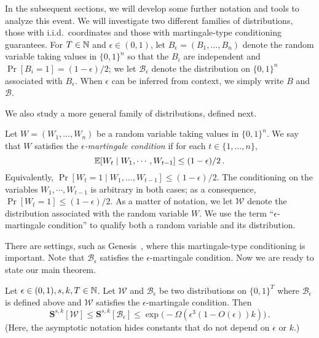 In the subsequent sections, we will develop some further notation and
tools to analyze this event.  We will investigate two different
families of distributions, those with i.i.d.\ coordinates and those
with martingale-type conditioning guarantees. For $T \in \mathbb{N}$ and
$\epsilon \in (0, 1)$, let $B_\epsilon = (B_1, \ldots, B_n)$ denote
the random variable taking values in $\{0,1\}^n$ so that the $B_i$ are
independent and $\Pr[B_i = 1] = (1 - \epsilon)/2$; we let
$\mathcal{B}_\epsilon$ denote the distribution on $\{0,1\}^n$
associated with $B_\epsilon$. When $\epsilon$ can be inferred from
context, we simply write $B$ and $\mathcal{B}$.

We also study a more general family of distributions, defined next.

\begin{definition}\label{def:eps-martingale}
  Let $W = (W_1, \ldots, W_n)$ be a random variable taking values in
  $\{0,1\}^n$.  We say that $W$ satisfies the
  \emph{$\epsilon$-martingale condition} if for each
  $t \in \{1, \ldots, n\}$,
  \[
    \operatorname{\mathbb{E}}[W_t \mid W_1, \cdots, W_{t-1}] \leq (1-\epsilon)/2\,.
  \]
  Equivalently,
  $\Pr[W_t = 1\mid W_1, \ldots, W_{t-1}] \leq (1-\epsilon)/2$. 
  The conditioning on the variables
  $W_1, \cdots, W_{t-1}$ is arbitrary in both cases; as a consequence,
  $\Pr[W_t = 1] \leq (1-\epsilon)/2$. As a matter of notation, we let
  $\mathcal{W}$ denote the distribution associated with the random
  variable $W$.  We use the term ``$\epsilon$-martingale condition''
  to qualify both a random variable and its distribution.
\end{definition}
There are settings, such as
Genesis~\cite{DBLP:journals/iacr/BadertscherGKRZ18}, where this
martingale-type conditioning is important.  Note that
$\mathcal{B}_\epsilon$ satisfies the $\epsilon$-martingale condition.
Now we are ready to state our main theorem.

\begin{theorem}\label{thm:main}
  Let $\epsilon \in (0, 1), s, k, T \in \mathbb{N}$.  Let
  $\mathcal{W}$ and $\mathcal{B}_\epsilon$ be two distributions on
  $\{0,1\}^T$ where $\mathcal{B}_\epsilon$ is defined above and
  $\mathcal{W}$ satisfies the $\epsilon$-martingale condition.
  Then 
  \[
    \mathbf{S}^{s,k}[\mathcal{W}] 
      \leq \mathbf{S}^{s,k}[\mathcal{B}_\epsilon] 
      \leq \exp\bigl(-\Omega(\epsilon^3 (1 - O(\epsilon))k)\bigr)
    \,.
  \]
  (Here, the asymptotic notation hides constants that do not depend on $\epsilon$ or $k$.)
\end{theorem}

